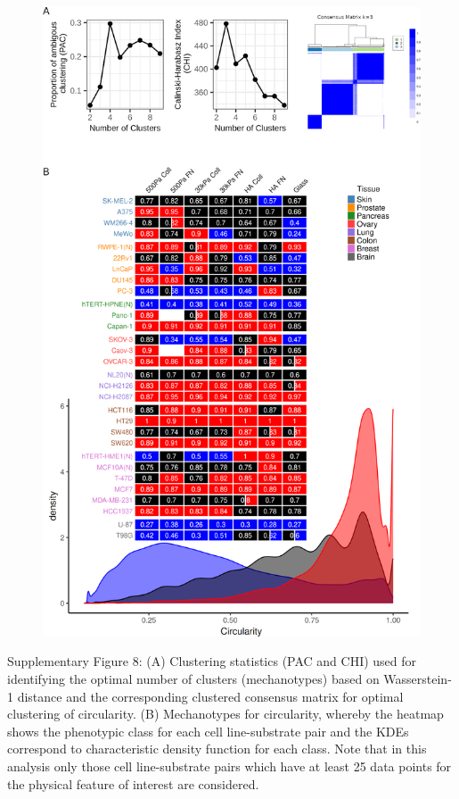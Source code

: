 \documentclass[11pt,letterpaper,english,oneside]{article} %
\begin{document}
\begin{figure}[H]
    \hspace*{-1cm}
    \centering
    \includegraphics[scale=0.282]{../Figures/Supplementary_Figure8/supplementary_figure8.png} 
    \caption{}
    \label{fig:fig8}
\end{figure}
\begin{adjustwidth}{1cm}{1cm}
Supplementary Figure 8: (A) Clustering statistics (PAC and CHI) used for identifying the optimal number of clusters (mechanotypes) based on Wasserstein-1 distance and the corresponding clustered consensus matrix for optimal clustering
of circularity. (B) Mechanotypes for circularity, whereby the heatmap shows the phenotypic class for each cell line-substrate pair and the KDEs correspond to characteristic density function for each class. 
Note that in this analysis only those cell line-substrate pairs which have at least 25 data points for the physical feature of interest are considered.
\end{adjustwidth}
\end{document}
